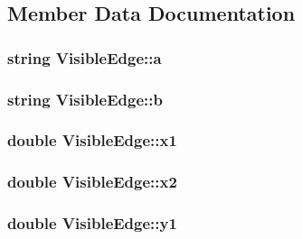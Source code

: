 \subsection{Member Data Documentation}
\subsubsection[{\texorpdfstring{a}{a}}]{\setlength{\rightskip}{0pt plus 5cm}string Visible\+Edge\+::a}\hypertarget{class_visible_edge_a221f90edb9fdd00dee37c29e2d6dc742}{}\label{class_visible_edge_a221f90edb9fdd00dee37c29e2d6dc742}
\subsubsection[{\texorpdfstring{b}{b}}]{\setlength{\rightskip}{0pt plus 5cm}string Visible\+Edge\+::b}\hypertarget{class_visible_edge_a6fc0c013bd80e5848e3dd5c4a2ea9dc4}{}\label{class_visible_edge_a6fc0c013bd80e5848e3dd5c4a2ea9dc4}
\subsubsection[{\texorpdfstring{x1}{x1}}]{\setlength{\rightskip}{0pt plus 5cm}double Visible\+Edge\+::x1}\hypertarget{class_visible_edge_a3720fa0f46627b8bb5c0daca218e1366}{}\label{class_visible_edge_a3720fa0f46627b8bb5c0daca218e1366}
\subsubsection[{\texorpdfstring{x2}{x2}}]{\setlength{\rightskip}{0pt plus 5cm}double Visible\+Edge\+::x2}\hypertarget{class_visible_edge_a2ad5ce3850a09736aaf4e1064d93ac28}{}\label{class_visible_edge_a2ad5ce3850a09736aaf4e1064d93ac28}
\subsubsection[{\texorpdfstring{y1}{y1}}]{\setlength{\rightskip}{0pt plus 5cm}double Visible\+Edge\+::y1}\hypertarget{class_visible_edge_a3246e485cc96d1a07dbbbdb3356b51e7}{}\label{class_visible_edge_a3246e485cc96d1a07dbbbdb3356b51e7}
